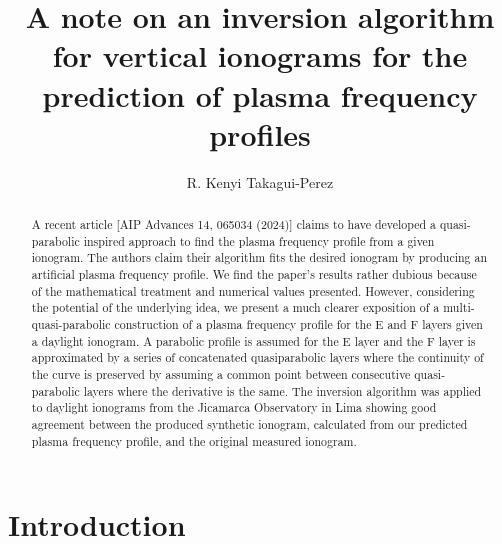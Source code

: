 \documentclass[aps,twocolumn,prb,showpacs,superscriptaddress]{revtex4-2}
\newcommand{\+}{\dagger}
\begin{document}
\title{A note on an inversion algorithm for vertical ionograms for the prediction of plasma frequency profiles}

\author{R. Kenyi Takagui-Perez}


\begin{abstract}
    A recent article [AIP Advances 14, 065034 (2024)] \cite{niu2024}
    claims to have developed a quasi-parabolic
    inspired approach to find the plasma frequency profile from a given ionogram. The authors claim
    their algorithm fits the desired ionogram by producing an artificial plasma frequency profile. We
    find the paper’s results rather dubious because of the mathematical treatment and numerical values presented.
    However, considering the potential of the underlying idea, we present a much clearer exposition of a
    multi-quasi-parabolic construction of a plasma frequency profile for the E and F layers given a daylight ionogram. A parabolic profile is assumed for the E layer and the F layer is approximated by a series of concatenated quasiparabolic layers where the continuity of the curve is preserved by assuming a common point between consecutive quasi-parabolic layers where the derivative is the same. The inversion algorithm was applied to daylight ionograms from the Jicamarca Observatory in Lima showing good agreement between the produced synthetic ionogram, calculated from our predicted plasma frequency profile, and the original measured ionogram. 
    
\end{abstract}

\maketitle




\section{Introduction}

\label{intro}
\end{document}
